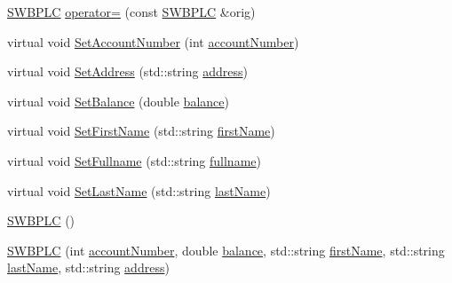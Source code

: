 \begin{DoxyCompactItemize}
\hyperlink{class_s_w_b_p_l_c}{S\+W\+B\+P\+LC} \hyperlink{class_s_w_b_p_l_c_a1e4b8f85d4e8e29429d691e258fea2e7_a1e4b8f85d4e8e29429d691e258fea2e7}{operator=} (const \hyperlink{class_s_w_b_p_l_c}{S\+W\+B\+P\+LC} \&orig)
\item 
virtual void \hyperlink{class_s_w_b_p_l_c_a45eb1e6a73fde0dc00824319d4e0b81a_a45eb1e6a73fde0dc00824319d4e0b81a}{Set\+Account\+Number} (int \hyperlink{class_s_w_b_p_l_c_a5d03f989254b88bdb7eb3deeec7e4217_a5d03f989254b88bdb7eb3deeec7e4217}{account\+Number})
\item 
virtual void \hyperlink{class_s_w_b_p_l_c_a99590e47dda8361b2d5869fd315f92f8_a99590e47dda8361b2d5869fd315f92f8}{Set\+Address} (std\+::string \hyperlink{class_s_w_b_p_l_c_a86edad3cbbc5903c8ab8a45b22c0dd15_a86edad3cbbc5903c8ab8a45b22c0dd15}{address})
\item 
virtual void \hyperlink{class_s_w_b_p_l_c_a9a0d94da8922f00ca4a3e5fa774e8b3f_a9a0d94da8922f00ca4a3e5fa774e8b3f}{Set\+Balance} (double \hyperlink{class_s_w_b_p_l_c_a34365efdc6dde37a4da9a6222dcde389_a34365efdc6dde37a4da9a6222dcde389}{balance})
\item 
virtual void \hyperlink{class_s_w_b_p_l_c_a8146eabca4648ef679188904f677df9d_a8146eabca4648ef679188904f677df9d}{Set\+First\+Name} (std\+::string \hyperlink{class_s_w_b_p_l_c_a38fd4817afe4aaac4993b0b4c7074b9c_a38fd4817afe4aaac4993b0b4c7074b9c}{first\+Name})
\item 
virtual void \hyperlink{class_s_w_b_p_l_c_a09376d46475bbceda897948714ff1e72_a09376d46475bbceda897948714ff1e72}{Set\+Fullname} (std\+::string \hyperlink{class_s_w_b_p_l_c_a5de90ba5cac0107fa5361458a0df839e_a5de90ba5cac0107fa5361458a0df839e}{fullname})
\item 
virtual void \hyperlink{class_s_w_b_p_l_c_aa5581ea5d2e0315b816876737e887f09_aa5581ea5d2e0315b816876737e887f09}{Set\+Last\+Name} (std\+::string \hyperlink{class_s_w_b_p_l_c_aa06b2e569dd1fef8e43dfda1b34d67f3_aa06b2e569dd1fef8e43dfda1b34d67f3}{last\+Name})
\item 
\hyperlink{class_s_w_b_p_l_c_a320f4e2b023038668d941ce5d0c46aeb_a320f4e2b023038668d941ce5d0c46aeb}{S\+W\+B\+P\+LC} ()
\item 
\hyperlink{class_s_w_b_p_l_c_a29c408f7ccb7c5962dab8ac858758a89_a29c408f7ccb7c5962dab8ac858758a89}{S\+W\+B\+P\+LC} (int \hyperlink{class_s_w_b_p_l_c_a5d03f989254b88bdb7eb3deeec7e4217_a5d03f989254b88bdb7eb3deeec7e4217}{account\+Number}, double \hyperlink{class_s_w_b_p_l_c_a34365efdc6dde37a4da9a6222dcde389_a34365efdc6dde37a4da9a6222dcde389}{balance}, std\+::string \hyperlink{class_s_w_b_p_l_c_a38fd4817afe4aaac4993b0b4c7074b9c_a38fd4817afe4aaac4993b0b4c7074b9c}{first\+Name}, std\+::string \hyperlink{class_s_w_b_p_l_c_aa06b2e569dd1fef8e43dfda1b34d67f3_aa06b2e569dd1fef8e43dfda1b34d67f3}{last\+Name}, std\+::string \hyperlink{class_s_w_b_p_l_c_a86edad3cbbc5903c8ab8a45b22c0dd15_a86edad3cbbc5903c8ab8a45b22c0dd15}{address})

\end{DoxyCompactItemize}
